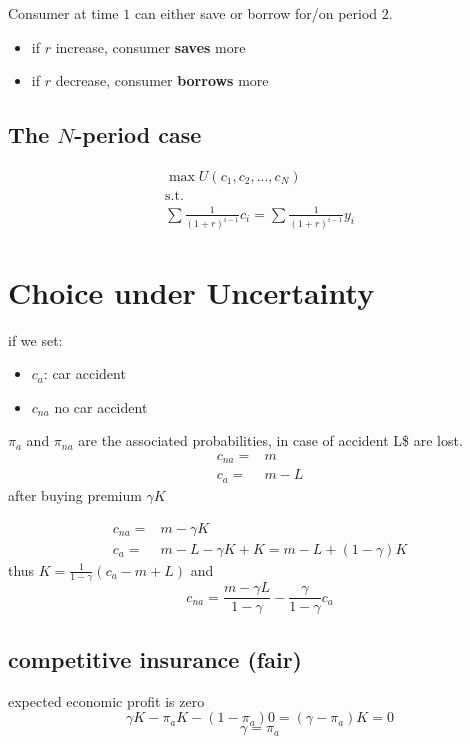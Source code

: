 \documentclass[a4paper] {scrartcl}
\begin{document}
Consumer at time $1$ can either save or borrow for/on period $2$.

\begin{itemize}
	\item if $r$ increase, consumer \textbf{saves} more
	\item if $r$ decrease, consumer \textbf{borrows} more
\end{itemize}

\subsection{The $N$-period case}
\begin{eqnarray}
	\max U(c_1, c_2, ..., c_N) \\
	 \text{s.t. }\\
	\sum  \frac{1}{(1+r)^{i-1}}c_i = \sum \frac{1}{(1+r)^{i-1}}y_i
\end{eqnarray}


\section{Choice under Uncertainty}
if we set: 
\begin{itemize}
	\item $c_a$: car accident
	\item $c_{na}$ no car accident
\end{itemize}
$\pi_a$ and $\pi_{na}$ are the associated probabilities, in case of accident L\$ are lost.
\begin{eqnarray}
	c_{na} =& m\\
	c_a =& m-L
\end{eqnarray}
after buying premium $\gamma K$

\begin{eqnarray}
	c_{na} =& m-\gamma K\\
	c_a =& m-L -\gamma K + K = m-L+(1-\gamma)K
\end{eqnarray}
thus $K=\frac{1}{1-\gamma}(c_a-m+L)$ and
\begin{equation}
	c_{na} = \frac{m-\gamma L}{1-\gamma}-\frac{\gamma}{1-\gamma}c_a
\end{equation}


\subsection{competitive insurance (fair)}
expected economic profit is zero
\begin{equation}
	\gamma K -\pi_aK-(1-\pi_a)0=(\gamma-\pi_a)K=0
\end{equation}
\begin{equation}
	\gamma = \pi_a
\end{equation}
\end{document}
